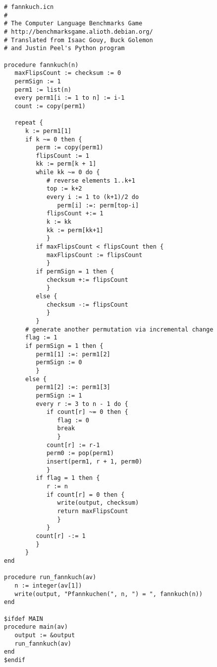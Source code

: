 \documentclass[letterpaper,12pt]{article}
\begin{document}
\begin{verbatim}
# fannkuch.icn
#
# The Computer Language Benchmarks Game
# http://benchmarksgame.alioth.debian.org/
# Translated from Isaac Gouy, Buck Golemon 
# and Justin Peel's Python program

procedure fannkuch(n)
   maxFlipsCount := checksum := 0
   permSign := 1
   perm1 := list(n)
   every perm1[i := 1 to n] := i-1
   count := copy(perm1) 

   repeat { 
      k := perm1[1]
      if k ~= 0 then {
         perm := copy(perm1) 
         flipsCount := 1
         kk := perm[k + 1]
         while kk ~= 0 do {
            # reverse elements 1..k+1
            top := k+2
            every i := 1 to (k+1)/2 do
               perm[i] :=: perm[top-i]
            flipsCount +:= 1
            k := kk
            kk := perm[kk+1]
            }
         if maxFlipsCount < flipsCount then {
            maxFlipsCount := flipsCount
            }
         if permSign = 1 then {
            checksum +:= flipsCount 
            }
         else { 
            checksum -:= flipsCount
            }
         }
      # generate another permutation via incremental change
      flag := 1
      if permSign = 1 then {
         perm1[1] :=: perm1[2]
         permSign := 0
         }
      else {
         perm1[2] :=: perm1[3]
         permSign := 1 
         every r := 3 to n - 1 do {
            if count[r] ~= 0 then {
               flag := 0
               break
               }
            count[r] := r-1
            perm0 := pop(perm1)
            insert(perm1, r + 1, perm0)
            }
         if flag = 1 then {
            r := n
            if count[r] = 0 then {
               write(output, checksum)
               return maxFlipsCount
               }
            }
         count[r] -:= 1
         }
      }
end

procedure run_fannkuch(av)
   n := integer(av[1])
   write(output, "Pfannkuchen(", n, ") = ", fannkuch(n))
end

$ifdef MAIN
procedure main(av)
   output := &output
   run_fannkuch(av)
end
$endif

\end{verbatim}

\newpage
\end{document}
